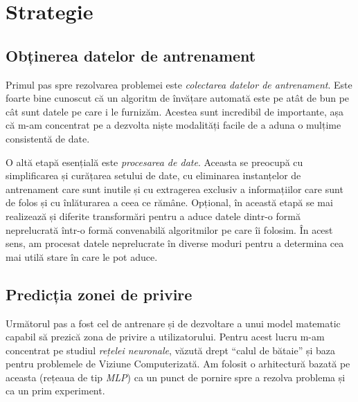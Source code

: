 
\section{Strategie}

\subsection{Obținerea datelor de antrenament}
Primul pas spre rezolvarea problemei este \emph{colectarea datelor de antrenament}.
Este foarte bine cunoscut că un algoritm de învățare automată este pe atât de bun pe cât sunt datele pe care i le furnizăm.
Acestea sunt incredibil de importante, așa că m-am concentrat pe a dezvolta niște modalități facile de a aduna o mulțime consistentă de date.

O altă etapă esențială este \emph{procesarea de date}.
Aceasta se preocupă cu simplificarea și curățarea setului de date, cu eliminarea instanțelor de antrenament care sunt inutile și cu extragerea exclusiv a informațiilor care sunt de folos și cu înlăturarea a ceea ce rămâne.
Opțional, în această etapă se mai realizează și diferite transformări pentru a aduce datele dintr-o formă neprelucrată într-o formă convenabilă algoritmilor pe care îi folosim.
În acest sens, am procesat datele neprelucrate în diverse moduri pentru a determina cea mai utilă stare în care le pot aduce.

\subsection{Predicția zonei de privire}
Următorul pas a fost cel de antrenare și de dezvoltare a unui model matematic capabil să prezică zona de privire a utilizatorului.
Pentru acest lucru m-am concentrat pe studiul \emph{rețelei neuronale}, văzută drept ``calul de bătaie'' și baza pentru problemele de Viziune Computerizată.
Am folosit o arhitectură bazată pe aceasta (rețeaua de tip \emph{MLP}) ca un punct de pornire spre a rezolva problema și ca un prim experiment.

